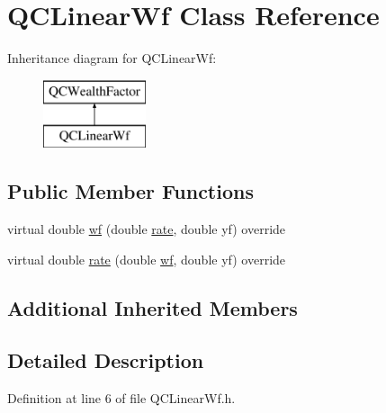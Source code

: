 \hypertarget{class_q_c_linear_wf}{\section{Q\+C\+Linear\+Wf Class Reference}
\label{class_q_c_linear_wf}
}
Inheritance diagram for Q\+C\+Linear\+Wf\+:\begin{figure}[H]
\begin{center}
\leavevmode
\includegraphics[height=2.000000cm]{class_q_c_linear_wf}
\end{center}
\end{figure}
\subsection*{Public Member Functions}
\begin{DoxyCompactItemize}
\item 
virtual double \hyperlink{class_q_c_linear_wf_ad9ac92ae46857a060f47ceda4291bd72}{wf} (double \hyperlink{class_q_c_linear_wf_ad0a049fd92a36cecd4b766b181a3cf7b}{rate}, double yf) override
\item 
virtual double \hyperlink{class_q_c_linear_wf_ad0a049fd92a36cecd4b766b181a3cf7b}{rate} (double \hyperlink{class_q_c_linear_wf_ad9ac92ae46857a060f47ceda4291bd72}{wf}, double yf) override
\end{DoxyCompactItemize}
\subsection*{Additional Inherited Members}


\subsection{Detailed Description}


Definition at line 6 of file Q\+C\+Linear\+Wf.\+h.



